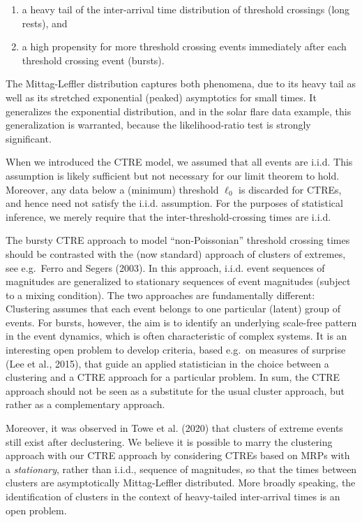 \documentclass[]{elsarticle} %
\begin{document}
\begin{enumerate}
\def\labelenumi{\roman{enumi})}
\item
  a heavy tail of the inter-arrival time distribution of threshold
  crossings (long rests), and
\item
  a high propensity for more threshold crossing events immediately after
  each threshold crossing event (bursts).
\end{enumerate}

The Mittag-Leffler distribution captures both phenomena, due to its
heavy tail as well as its stretched exponential (peaked) asymptotics for
small times. It generalizes the exponential distribution, and in the
solar flare data example, this generalization is warranted, because the
likelihood-ratio test is strongly significant.

When we introduced the CTRE model, we assumed that all events are i.i.d.
This assumption is likely sufficient but not necessary for our limit
theorem to hold. Moreover, any data below a (minimum) threshold
\(\ell_0\) is discarded for CTREs, and hence need not satisfy the i.i.d.
assumption. For the purposes of statistical inference, we merely require
that the inter-threshold-crossing times are i.i.d.

The bursty CTRE approach to model ``non-Poissonian'' threshold crossing
times should be contrasted with the (now standard) approach of clusters
of extremes, see e.g.~Ferro and Segers (2003). In this approach, i.i.d.
event sequences of magnitudes are generalized to stationary sequences of
event magnitudes (subject to a mixing condition). The two approaches are
fundamentally different: Clustering assumes that each event belongs to
one particular (latent) group of events. For bursts, however, the aim is
to identify an underlying scale-free pattern in the event dynamics,
which is often characteristic of complex systems. It is an interesting
open problem to develop criteria, based e.g.~on measures of surprise
(Lee et al., 2015), that guide an applied statistician in the choice
between a clustering and a CTRE approach for a particular problem. In
sum, the CTRE approach should not be seen as a substitute for the usual
cluster approach, but rather as a complementary approach.

Moreover, it was observed in Towe et al. (2020) that clusters of extreme
events still exist after declustering. We believe it is possible to
marry the clustering approach with our CTRE approach by considering
CTREs based on MRPs with a \emph{stationary}, rather than i.i.d.,
sequence of magnitudes, so that the times between clusters are
asymptotically Mittag-Leffler distributed. More broadly speaking, the
identification of clusters in the context of heavy-tailed inter-arrival
times is an open problem.
\end{document}
